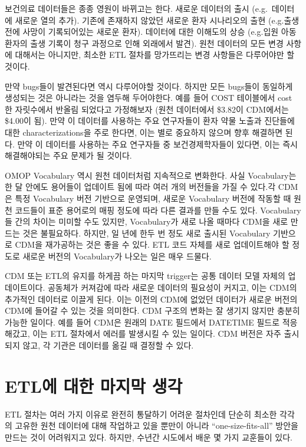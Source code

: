 \documentclass[11pt]{book}
\theoremstyle{definition}
\theoremstyle{definition}
\theoremstyle{definition}
\theoremstyle{remark}
\begin{document}
보건의료 데이터들은 종종 영원이 바뀌고는 한다. 새로운 데이터의 출시
(e.g.~데이터에 새로운 열의 추가). 기존에 존재하지 않았던 새로운 환자
시나리오의 출현 (e.g.출생 전에 사망이 기록되어있는 새로운 환자).
데이터에 대한 이해도의 상승 (e.g.입원 아동 환자의 출생 기록이 청구
과정으로 인해 외래에서 발견). 원천 데이터의 모든 변경 사항에 대해서는
아니지만, 최소한 ETL 절차를 망가뜨리는 변경 사항들은 다루어야만 할
것이다.

만약 bugs들이 발견된다면 역시 다루어야할 것이다. 하지만 모든 bugs들이
동일하게 생성되는 것은 아니라는 것을 염두해 두어야한다. 예를 들어 COST
테이블에서 cost 한 자릿수에서 반올림 되었다고 가정해보자 (원천
데이터에서 \$3.82이 CDM에서는 \$4.00이 됨). 만약 이 데이터를 사용하는
주요 연구자들이 환자 약물 노출과 진단들에 대한 characterizations을 주로
한다면, 이는 별로 중요하지 않으며 향후 해결하면 된다. 만약 이 데이터를
사용하는 주요 연구자들 중 보건경제학자들이 있다면, 이는 즉시
해결해야되는 주요 문제가 될 것이다.

OMOP Vocabulary 역시 원천 데이터처럼 지속적으로 변화한다. 사실
Vocabulary는 한 달 안에도 용어들이 업데이트 됨에 따라 여러 개의 버전들을
가질 수 있다.각 CDM은 특정 Vocabulary 버전 기반으로 운영되며, 새로운
Vocabulary 버전에 작동할 때 원천 코드들이 표준 용어로의 매핑 정도에 따라
다른 결과를 만들 수도 있다. Vocabulary들 간의 차이는 미미할 수도 있지만,
Vocabulary가 새로 나올 때마다 CDM을 새로 만드는 것은 불필요하다. 하지만,
일 년에 한두 번 정도 새로 출시된 Vocabulary 기반으로 CDM을 재가공하는
것은 좋을 수 있다. ETL 코드 자체를 새로 업데이트해야 할 정도로 새로운
버전의 Vocabulary가 나오는 일은 매우 드물다.

CDM 또는 ETL의 유지를 하게끔 하는 마지막 trigger는 공통 데이터 모델
자체의 업데이트이다. 공동체가 커져감에 따라 새로운 데이터의 필요성이
커지고, 이는 CDM의 추가적인 데이터로 이끌게 된다. 이는 이전의 CDM에
없었던 데이터가 새로운 버전의 CDM에 들어갈 수 있는 것을 의미한다. CDM
구조의 변화는 잘 생기지 않지만 충분히 가능한 일이다. 예를 들어 CDM은
원래의 DATE 필드에서 DATETIME 필드로 적응해갔고, 이는 ETL 절차에서
에러를 발생시킬 수 있는 일이다. CDM 버전은 자주 출시되지 않고, 각 기관은
데이터를 옮길 때 결정할 수 있다.

\section{ETL에 대한 마지막 생각}\label{etl---}

ETL 절차는 여러 가지 이유로 완전히 통달하기 어려운 절차인데 단순히
최소한 각각의 고유한 원천 데이터에 대해 작업하고 있을 뿐만이 아니라
``one-size-fits-all'' 방안을 만드는 것이 어려워지고 있다. 하지만, 수년간
시도에서 배운 몇 가지 교훈들이 있다.
\end{document}
